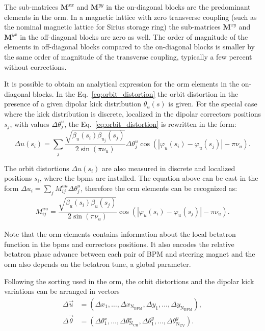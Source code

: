 The sub-matrices $\mathbf{M}^{xx}$ and $\mathbf{M}^{yy}$ in the on-diagonal blocks are the predominant elements in the \gls{orm}. In a magnetic lattice with zero transverse coupling (such as the nominal magnetic lattice for Sirius storage ring) the sub-matrices $\mathbf{M}^{xy}$ and $\mathbf{M}^{yx}$ in the off-diagonal blocks are zero as well. The order of magnitude of the elements in off-diagonal blocks compared to the on-diagonal blocks is smaller by the same order of magnitude of the transverse coupling, typically a few percent without corrections.

It is possible to obtain an analytical expression for the \gls{orm} elements in the on-diagonal blocks. In the Eq.~\eqref{eq:orbit_distortion} the orbit distortion in the presence of a given dipolar kick distribution $\theta_u(s)$ is given. For the special case where the kick distribution is discrete, localized in the dipolar correctors positions $s_j$, with values $\Delta \theta^{u}_{j}$, the Eq.~\eqref{eq:orbit_distortion} is rewritten in the form:
\begin{equation}
    \Delta u(s_i) = \sum_{j} \dfrac{\sqrt{\beta_{u}(s_i)\beta_{u_j}(s_j)}}{2\sin\left(\pi\nu_{u}\right)} \Delta \theta^{u}_j \cos\left( |\varphi_{u}(s_i) - \varphi_{u}(s_j)| - \pi\nu_{u} \right).
    \label{eq:discrete_orbit_distortion}
\end{equation}

The orbit distortions $\Delta u(s_i)$ are also measured in discrete and localized positions $s_i$, where the \gls{bpm}s are installed. The equation above can be cast in the form $\Delta u_i = \sum_{j} M_{ij}^{uu} \Delta \theta_{j}^{u}$, therefore the \gls{orm} elements can be recognized as:
\begin{align}
M_{ij}^{uu} = \dfrac{\sqrt{\beta_{u}(s_i)\beta_{u}(s_j)}}{2\sin\left(\pi\nu_{u}\right)}\cos\left( |\varphi_{u}(s_i) - \varphi_{u}(s_j)| - \pi\nu_{u} \right).
\label{eq:matrix_elements}
\end{align}

Note that the \gls{orm} elements contains information about the local betatron function in the \gls{bpm}s and correctors positions. It also encodes the relative betatron phase advance between each pair of BPM and steering magnet and the \gls{orm} also depends on the betatron tune, a global parameter. 

Following the sorting used in the \gls{orm}, the orbit distortions and the dipolar kick variations can be arranged in vectors
\begin{align*}
    \Delta \vec{u} &= \left(\Delta x_1, \ldots, \Delta x_{\mathrm{N}_{\mathrm{BPM}}}, \Delta y_1, \ldots, \Delta y_{\mathrm{N}_{\mathrm{BPM}}}\right), \\
    \Delta \vec{\theta} &= \left(\Delta \theta_1^x, \ldots, \Delta \theta_{\mathrm{N}_{\mathrm{CH}}}^x, \Delta \theta_1^y, \ldots, \Delta \theta_{\mathrm{N}_{\mathrm{CV}}}^y\right).
\end{align*}

